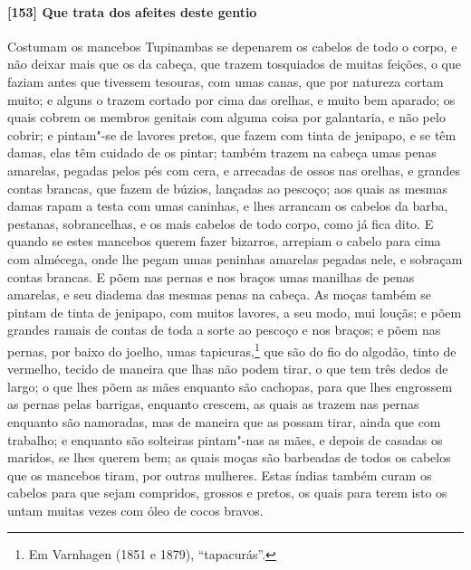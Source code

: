 \paragraph{[153] Que trata dos afeites deste gentio}\quad
Costumam os mancebos Tupinambas se depenarem os cabelos de todo o corpo, e não deixar
mais que os da cabeça, que trazem tosquiados de muitas feições, o que faziam antes que
tivessem tesouras, com umas canas, que por natureza cortam muito; e alguns o trazem
cortado por cima das orelhas, e muito bem aparado; os quais cobrem os membros genitais com
alguma coisa por galantaria, e não pelo cobrir; e pintam"-se de lavores pretos, que fazem
com tinta de jenipapo, e se têm damas, elas têm cuidado de os pintar; também trazem na
cabeça umas penas amarelas, pegadas pelos pés com cera, e arrecadas de ossos nas orelhas,
e grandes contas brancas, que fazem de búzios, lançadas ao pescoço; aos quais as mesmas
damas rapam a testa com umas caninhas, e lhes arrancam os cabelos da barba, pestanas,
sobrancelhas, e os mais cabelos de todo corpo, como já fica dito. E quando se estes
mancebos querem fazer bizarros, arrepiam o cabelo para cima com almécega, onde lhe pegam
umas peninhas amarelas pegadas nele, e sobraçam contas brancas. E põem nas pernas e nos
braços umas manilhas de penas amarelas, e seu diadema das mesmas penas na cabeça. As moças
também se pintam de tinta de jenipapo, com muitos lavores, a seu modo, mui louçãs; e põem
grandes ramais de contas de toda a sorte ao pescoço e nos braços; e põem nas pernas, por
baixo do joelho, umas tapicuras,\footnote{ Em Varnhagen (1851 e 1879), ``tapacurás''.} que
são do fio do algodão, tinto de vermelho, tecido de maneira que lhas não podem tirar, o
que tem três dedos de largo; o que lhes põem as mães enquanto são cachopas, para que lhes
engrossem as pernas pelas barrigas, enquanto crescem, as quais as trazem nas pernas
enquanto são namoradas, mas de maneira que as possam tirar, ainda que com trabalho; e
enquanto são solteiras pintam"-nas as mães, e depois de casadas os maridos, se lhes querem
bem; as quais moças são barbeadas de todos os cabelos que os mancebos tiram, por outras
mulheres. Estas índias também curam os cabelos para que sejam compridos, grossos e pretos,
os quais para terem isto os untam muitas vezes com óleo de cocos bravos.

